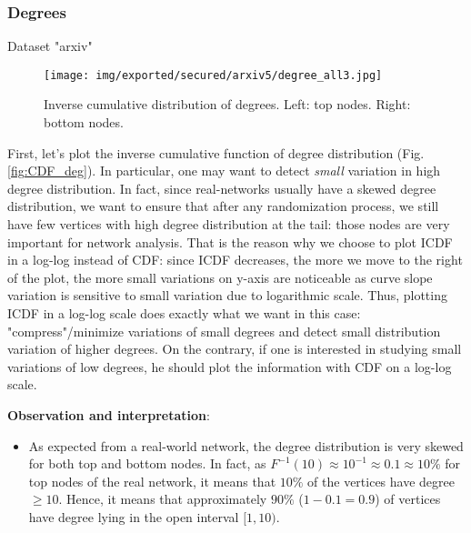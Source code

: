 \documentclass[table]{report}
\begin{document}
\subsubsection{Degrees}


Dataset "arxiv"



\begin{figure}[h]%
\centering
\texttt{[image: img/exported/secured/arxiv5/degree\_all3.jpg]}
\caption{Inverse cumulative distribution of degrees. Left: top nodes. Right: bottom nodes.}
\label{fig:degree_all}
\end{figure}
\FloatBarrier

First, let's plot the inverse cumulative function of degree distribution (Fig. \ref{fig:CDF_deg}). In particular, one may want to detect \textit{small} variation in high degree distribution. In fact, since real-networks usually have a skewed degree distribution, we want to ensure that after any randomization process, we still have few vertices with high degree distribution at the tail: those nodes are very important for network analysis. That is the reason why we choose to plot ICDF in a log-log instead of CDF: since ICDF decreases, the more we move to the right of the plot, the more small variations on y-axis are noticeable as curve slope variation is sensitive to small variation due to logarithmic scale. Thus, plotting ICDF in a log-log scale does exactly what we want in this case: "compress"/minimize variations of small degrees and detect small distribution variation of higher degrees. 
On the contrary, if one is interested in studying small variations of low degrees, he should plot the information with CDF on a log-log scale. 

\bigbreak

\noindent
\textbf{Observation and interpretation}:

\begin{itemize}[noitemsep]
    \item As expected from a real-world network, the degree distribution is very skewed for both top and bottom nodes. In fact, as $F^{-1}(10) \approx 10^{-1} \approx 0.1 \approx 10 \%$ for top nodes of the real network, it means that $10 \%$ of the vertices have degree $\geq 10$. Hence, it means that approximately $90 \%$ ($1-0.1 = 0.9$) of vertices have degree lying in the open interval $[1,10)$. 
\end{itemize}  

 
\end{document}
